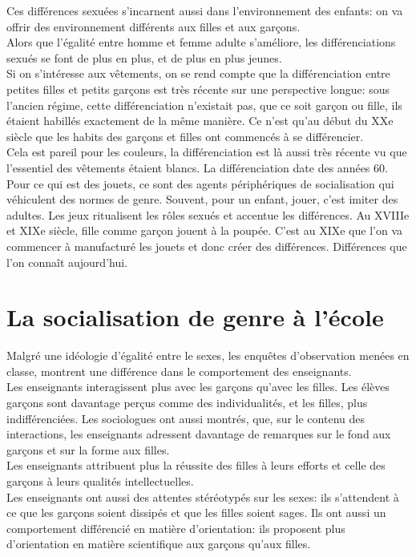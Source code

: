 \documentclass[12pt, a4paper, openany]{book}
\begin{document}
Ces différences sexuées s'incarnent aussi dans l'environnement des enfants: on va offrir des environnement différents aux filles et aux garçons. \\ 
Alors que l'égalité entre homme et femme adulte s'améliore, les différenciations sexués se font de plus en plus, et de plus en plus jeunes. \\
Si on s'intéresse aux vêtements, on se rend compte que la différenciation entre petites filles et petits garçons est très récente sur une perspective longue: sous l'ancien régime, cette différenciation n'existait pas, que ce soit garçon ou fille, ils étaient habillés exactement de la même manière. Ce n'est qu'au début du XXe siècle que les habits des garçons et filles ont commencés à se différencier. \\ 
Cela est pareil pour les couleurs, la différenciation est là aussi très récente vu que l'essentiel des vêtements étaient blancs. La différenciation date des années 60. \\
Pour ce qui est des jouets, ce sont des agents périphériques de socialisation qui véhiculent des normes de genre. Souvent, pour un enfant, jouer, c'est imiter des adultes. Les jeux ritualisent les rôles sexués et accentue les différences. Au XVIIIe et XIXe siècle, fille comme garçon jouent à la poupée. C'est au XIXe que l'on va commencer à manufacturé les jouets et donc créer des différences. Différences que l'on connaît aujourd'hui.

\section{La socialisation de genre à l'école}

Malgré une idéologie d'égalité entre le sexes, les enquêtes d'observation menées en classe, montrent une différence dans le comportement des enseignants. \\
Les enseignants interagissent plus avec les garçons qu'avec les filles. Les élèves garçons sont davantage perçus comme des individualités, et les filles, plus indifférenciées. Les sociologues ont aussi montrés, que, sur le contenu des interactions, les enseignants adressent davantage de remarques sur le fond aux garçons et sur la forme aux filles. \\
Les enseignants attribuent plus la réussite des filles à leurs efforts et celle des garçons à leurs qualités intellectuelles. \\
Les enseignants ont aussi des attentes stéréotypés sur les sexes: ils s'attendent à ce que les garçons soient dissipés et que les filles soient sages. Ils ont aussi un comportement différencié en matière d'orientation: ils proposent plus d'orientation en matière scientifique aux garçons qu'aux filles. 
\end{document}
